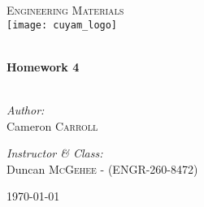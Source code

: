 \begin{titlepage}
\begin{center}

\textsc{\Large Engineering Materials}\\[0.5cm]
\texttt{[image: cuyam\_logo]}

\HRule \\[0.4cm]
{ \LARGE \bfseries Homework 4}\\[0.5cm]

\HRule \\[1.5cm]

\begin{minipage}{0.4\textwidth}
\begin{flushleft} \large
\emph{Author:}\\
Cameron \textsc{Carroll}
\end{flushleft}
\end{minipage}
\begin{minipage}{0.4\textwidth}
\begin{flushright} \large
\emph{Instructor \& Class:}\\
Duncan \textsc{McGehee} - (ENGR-260-8472)
\end{flushright}
\end{minipage}

\vfill

{\large \today}

\end{center}
\end{titlepage}